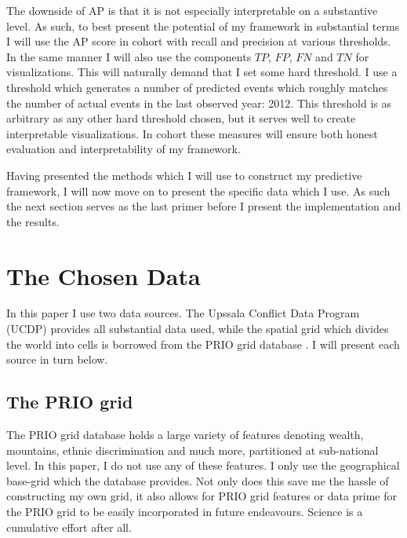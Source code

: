 \documentclass[a4paper]{article}
\begin{document}
The downside of AP is that it is not especially interpretable on a substantive level. As such, to best present the potential of my framework in substantial terms I will use the AP score in cohort with recall and precision at various thresholds. In the same manner I will also use the components $TP$, $FP$, $FN$ and $TN$ for visualizations. This will naturally demand that I set some hard threshold. I use a threshold which generates a number of predicted events which roughly matches the number of actual events in the last observed year: 2012. This threshold is as arbitrary as any other hard threshold chosen, but it serves well to create interpretable visualizations. In cohort these measures will ensure both honest evaluation and interpretability of my framework.\par %

Having presented the methods which I will use to construct my predictive framework, I will now move on to present the specific data which I use. As such the next section serves as the last primer before I present the implementation and the results.\par

\section{The Chosen Data}\label{data}%

In this paper I use two data sources. The Upssala Conflict Data Program (UCDP) \citep{Sundberg_2013, Croicu_Sundberg_2017} provides all substantial data used, while the spatial grid which divides the world into cells is borrowed from the PRIO grid database \citep{Tollefsen_2012}. I will present each source in turn below.\par

\subsection{The PRIO grid}

The PRIO grid database holds a large variety of features denoting wealth, mountains, ethnic discrimination and much more, partitioned at sub-national level. In this paper, I do not use any of these features. I only use the geographical base-grid which the database provides. Not only does this save me the hassle of constructing my own grid, it also allows for PRIO grid features or data prime for the PRIO grid to be easily incorporated in future endeavours. Science is a cumulative effort after all.\par 
\end{document}
